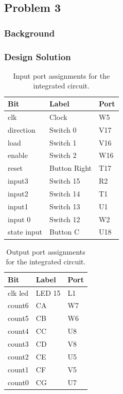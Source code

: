 \documentclass[11pt]{article}
\begin{document}

\subsection{Problem 3}

\subsubsection{Background}


\subsubsection{Design Solution}


\begin{table}[H]
\begin{center}
\begin{tabular}{| l | l | l |}
	\hline
	Bit & Label & Port \\ \hline
	clk &  Clock & W5 \\ \hline
	direction & Switch 0 & V17 \\ \hline
	load & Switch 1 & V16 \\ \hline
	enable & Switch 2 & W16 \\ \hline
	reset & Button Right & T17 \\ \hline
	input3 & Switch 15 & R2 \\ \hline
	input2 & Switch 14 & T1 \\ \hline
	input1 & Switch 13 & U1 \\ \hline
	input 0 & Switch 12 & W2 \\ \hline
	state input & Button C & U18 \\ \hline
\end{tabular}
\caption{\label{tab:integration_input_Ports}Input port assignments for  the integrated circuit.}
\end{center}
\end{table}

\begin{table}[H]
\begin{center}
\begin{tabular}{| l | l | l |}
	\hline
	Bit & Label & Port \\ \hline
	clk led & LED 15 & L1 \\ \hline
	count6 & CA & W7 \\ \hline
	count5 & CB & W6 \\ \hline
	count4 & CC & U8 \\ \hline
	count3 & CD & V8 \\ \hline
	count2 & CE & U5 \\ \hline
	count1 & CF & V5 \\ \hline
	count0 & CG & U7 \\ \hline
\end{tabular}
\caption{\label{tab:integration_output_Ports}Output port assignments for the integrated circuit.}
\end{center}
\end{table}
\end{document}
